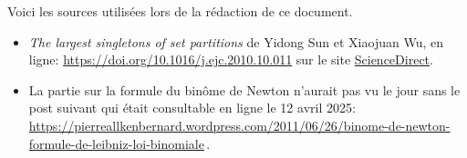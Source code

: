 Voici les sources utilisées lors de la rédaction de ce document.
%
\begin{itemize}[wide]
	\item \emph{\og The largest singletons of set partitions \fg}
de Yidong Sun et Xiaojuan Wu, en ligne:
	\url{https://doi.org/10.1016/j.ejc.2010.10.011}
	sur le site \href{https://www.sciencedirect.com/}{ScienceDirect}.

	\item La partie sur la formule du binôme de Newton n'aurait pas vu le jour sans le post suivant qui était consultable en ligne le 12 avril 2025:
	\url{https://pierreallkenbernard.wordpress.com/2011/06/26/binome-de-newton-formule-de-leibniz-loi-binomiale}\,.
\end{itemize}